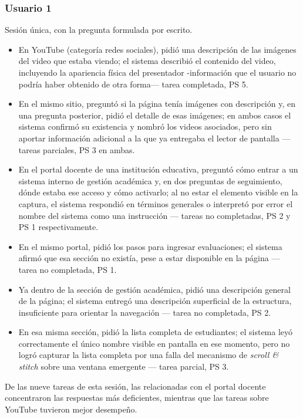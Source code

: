 \subsubsection{Usuario 1}

Sesión única, con la pregunta formulada por escrito.

\begin{itemize}
    \item En YouTube (categoría redes sociales), pidió una descripción de las imágenes del video que estaba viendo; el sistema describió el contenido del video, incluyendo la apariencia física del presentador -información que el usuario no podría haber obtenido de otra forma— tarea completada, PS 5.
    \item En el mismo sitio, preguntó si la página tenía imágenes con descripción y, en una pregunta posterior, pidió el detalle de esas imágenes; en ambos casos el sistema confirmó su existencia y nombró los videos asociados, pero sin aportar información adicional a la que ya entregaba el lector de pantalla — tareas parciales, PS 3 en ambas.
    \item En el portal docente de una institución educativa, preguntó cómo entrar a un sistema interno de gestión académica y, en dos preguntas de seguimiento, dónde estaba ese acceso y cómo activarlo; al no estar el elemento visible en la captura, el sistema respondió en términos generales o interpretó por error el nombre del sistema como una instrucción — tareas no completadas, PS 2 y PS 1 respectivamente.
    \item En el mismo portal, pidió los pasos para ingresar evaluaciones; el sistema afirmó que esa sección no existía, pese a estar disponible en la página — tarea no completada, PS 1.
    \item Ya dentro de la sección de gestión académica, pidió una descripción general de la página; el sistema entregó una descripción superficial de la estructura, insuficiente para orientar la navegación — tarea no completada, PS 2.
    \item En esa misma sección, pidió la lista completa de estudiantes; el sistema leyó correctamente el único nombre visible en pantalla en ese momento, pero no logró capturar la lista completa por una falla del mecanismo de \textit{scroll \& stitch} sobre una ventana emergente — tarea parcial, PS 3.
\end{itemize}

De las nueve tareas de esta sesión, las relacionadas con el portal docente concentraron las respuestas más deficientes, mientras que las tareas sobre YouTube tuvieron mejor desempeño.

